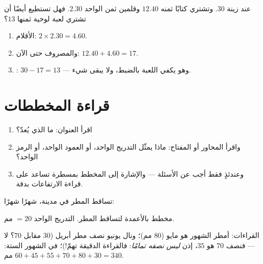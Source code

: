 \begin{example}\label{ex:g5:data:budget}
عند زينة $30$. وتشتري كتابًا ثمنه $12.40$ وقلمين ثمن الواحد $2.30$.
فهل تستطيع أيضًا أن تشتري لعبة لوحية ثمنها $13$؟
\begin{enumerate}
  \item الأقلام: $2 \times 2.30 = 4.60$.
  \item والمصروف حتى الآن: $12.40 + 4.60 = 17$.
  \item {}: $30 - 17 = 13$ --- وهو يكفي اللعبة بالضبط،
        ولا يبقى شيء.
\end{enumerate}
\end{example}

\section{قراءة المخططات}

\begin{method}\label{met:g5:data:read}
\begin{enumerate}
  \item اقرأ العنوان: ما الذي يُعدّ؟
  \item واقرأ المحاور أو المفتاح: ماذا يمثّل التدريج الواحد، أو
        العمود الواحد، أو الرمز الواحد؟
  \item وعندئذٍ فقط أجب عن الأسئلة --- والإشارة إلى المخطط
        بمسطرة تساعد على قراءة الارتفاعات بدقة.
\end{enumerate}
\end{method}

\begin{example}\label{ex:g5:data:chart}
تساقط المطر في مدينة، شهرًا شهرًا:

\begin{omfigure}

{\small مخطط بالأعمدة لتساقط المطر. التدريج الواحد $= 20$ مم.}
\end{omfigure}

القراءات: أمطر الشهور هو مايو ($80$ مم)؛ ونال يونيو نصف
مطر أبريل ($30$ مقابل $70$؟ لا --- فنصف $70$ هو $35$، إذن
\emph{ليس نصفه تمامًا}: فالقراءة الدقيقة تهمّ!)؛  في
الشهور الستة: $60 + 45 + 55 + 70 + 80 + 30 = 340$ مم.
\end{example}

